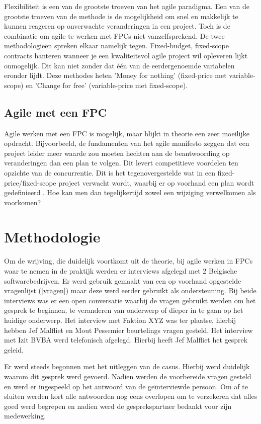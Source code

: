 \documentclass{hogent-article}
\begin{document}
    Flexibiliteit is een van de grootste troeven van het agile paradigma. Een van de grootste troeven van de methode is de mogelijkheid om snel en makkelijk te kunnen reageren op onverwachte veranderingen in een project. Toch is de combinatie om agile te werken met FPCs niet vanzelfsprekend. De twee methodologieën spreken elkaar namelijk tegen. Fixed-budget, fixed-scope contracts hanteren wanneer je een kwaliteitsvol agile project wil opleveren lijkt onmogelijk. Dit kan niet zonder dat één van de eerdergenoemde variabelen eronder lijdt. Deze methodes heten 'Money for nothing' (fixed-price met variable-scope) en 'Change for free' (variable-price met fixed-scope). 
    
    \subsection{Agile met een FPC}
    Agile werken met een FPC is mogelijk, maar blijkt in theorie een zeer moeilijke opdracht. Bijvoorbeeld, de fundamenten van het agile manifesto zeggen dat een project leider meer waarde zou moeten hechten aan de beantwoording op veranderingen dan een plan te volgen. Dit levert competitieve voordelen ten opzichte van de concurrentie. Dit is het tegenovergestelde wat in een fixed-price/fixed-scope project verwacht wordt, waarbij er op voorhand een plan wordt gedefinieerd \autocite{PMI2011}. Hoe kan men dan tegelijkertijd zowel een wijziging verwelkomen als voorkomen?
	
	
	\section{Methodologie}
	Om de wrijving, die duidelijk voortkomt uit de theorie, bij agile werken in FPCs waar te nemen in de praktijk werden er interviews afgelegd met 2 Belgische softwarebedrijven. Er werd gebruik gemaakt van een op voorhand opgestelde vragenlijst (\ref{vragen}) maar deze werd eerder gebruikt als ondersteuning. Bij beide interviews was er een open conversatie waarbij de vragen gebruikt werden om het gesprek te beginnen, te veranderen van onderwerp of dieper in te gaan op het huidige onderwerp. Het interview met Faktion XYZ was ter plaatse, hierbij hebben Jef Malfliet en Mout Pessemier beurtelings vragen gesteld. Het interview met Izit BVBA werd telefonisch afgelegd. Hierbij heeft Jef Malfliet het gesprek geleid.
	
	Er werd steeds begonnen met het uitleggen van de casus.  Hierbij werd duidelijk waarom dit gesprek werd gevoerd. Nadien werden de voorbereide vragen gesteld en werd er ingespeeld op het antwoord van de geïnterviewde persoon. Om af te sluiten werden kort alle antwoorden nog eens overlopen om te verzekeren dat alles goed werd begrepen en nadien werd de gesprekspartner bedankt voor zijn medewerking.
	
\end{document}

